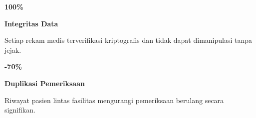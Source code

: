 \documentclass[a4paper]{article}
\begin{document}
\noindent
\begin{minipage}[t]{0.485\textwidth}
    \noindent\colorbox{BlueBg}{%
        \begin{minipage}[t][2.7cm][c]{\dimexpr\linewidth-2\fboxsep\relax}
            \centering
            {\fontsize{20}{24}\selectfont\bfseries\color{BluePrimary} 100\%}\par\vspace{2pt}
            {\fontsize{9.5}{12}\selectfont\bfseries\color{BlueDark} Integritas Data}\par\vspace{2pt}
            {\fontsize{8.5}{11}\selectfont\color{TextDark}Setiap rekam medis terverifikasi kriptografis dan tidak dapat dimanipulasi tanpa jejak.}
        \end{minipage}}\par
    \vspace{6pt}
    \noindent\colorbox{BlueBg}{%
        \begin{minipage}[t][2.7cm][c]{\dimexpr\linewidth-2\fboxsep\relax}
            \centering
            {\fontsize{20}{24}\selectfont\bfseries\color{BluePrimary} -70\%}\par\vspace{2pt}
            {\fontsize{9.5}{12}\selectfont\bfseries\color{BlueDark} Duplikasi Pemeriksaan}\par\vspace{2pt}
            {\fontsize{8.5}{11}\selectfont\color{TextDark}Riwayat pasien lintas fasilitas mengurangi pemeriksaan berulang secara signifikan.}
        \end{minipage}}%
\end{minipage}%
\hfill
\end{document}
